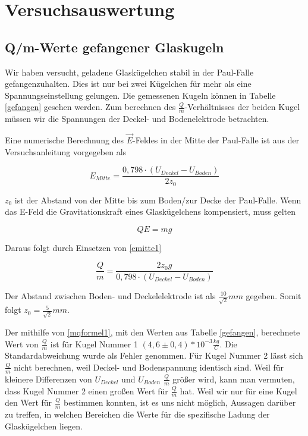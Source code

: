 \documentclass[10pt,a4paper]{article}
\begin{document}
\section{Versuchsauswertung}

\subsection{Q/m-Werte gefangener Glaskugeln}

Wir haben versucht, geladene Glaskügelchen stabil in der Paul-Falle gefangenzuhalten. Dies ist nur bei zwei Kügelchen für mehr als eine Spannungseinstellung gelungen. Die gemessenen Kugeln können in Tabelle \ref{gefangen} gesehen werden. Zum berechnen des $\frac{Q}{m}$-Verhältnisses der beiden Kugel müssen wir die Spannungen der Deckel- und Bodenelektrode betrachten.

Eine numerische Berechnung des $\vec{E}$-Feldes in der Mitte der Paul-Falle ist aus der Versuchsanleitung vorgegeben als 

\begin{equation}
	E_{Mitte} = \frac{0,798 \cdot (U_{Deckel} - U_{Boden})}{2 z_0}
	\label{emitte1}
\end{equation}

$z_0$ ist der Abstand von der Mitte bis zum Boden/zur Decke der Paul-Falle. Wenn das E-Feld die Gravitationskraft eines Glaskügelchens kompensiert, muss gelten

\begin{equation}
	Q E = m g
\end{equation}

Daraus folgt durch Einsetzen von \eqref{emitte1}

\begin{equation}
	\frac{Q}{m} = \frac{2 z_0 g}{0,798 \cdot(U_{Deckel} - U_{Boden})}
	\label{mqformel1}
\end{equation}

 Der Abstand zwischen Boden- und Deckelelektrode ist als $\frac{10}{\sqrt{2}}mm$ gegeben. Somit folgt $z_0 = \frac{5}{\sqrt{2}}mm$.
 
 Der mithilfe von \eqref{mqformel1}, mit den Werten aus Tabelle \ref{gefangen}, berechnete Wert von $\frac{Q}{m}$ ist für Kugel Nummer 1 $(4,6 \pm 0,4)*10^{-3} \frac{kg}{C}$. Die Standardabweichung wurde als Fehler genommen. Für Kugel Nummer 2 lässt sich $\frac{Q}{m}$ nicht berechnen, weil Deckel- und Bodenspannung identisch sind. Weil für kleinere Differenzen von $U_{Deckel}$ und $U_{Boden}$ $\frac{Q}{m}$ größer wird, kann man vermuten, dass Kugel Nummer 2 einen großen Wert für $\frac{Q}{m}$ hat. Weil wir nur für eine Kugel den Wert für $\frac{Q}{m}$ bestimmen konnten, ist es uns nicht möglich, Aussagen darüber zu treffen, in welchen Bereichen die Werte für die spezifische Ladung der Glaskügelchen liegen.
\end{document}
